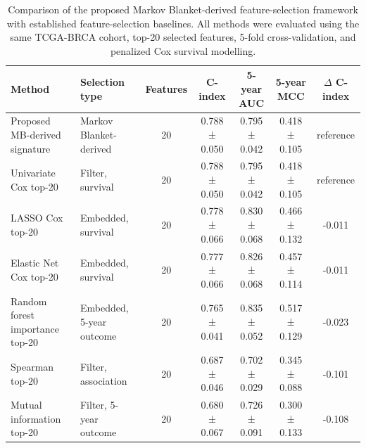 \begin{table}[htbp]
\centering
\small
\caption{Comparison of the proposed Markov Blanket-derived feature-selection framework with established feature-selection baselines. All methods were evaluated using the same TCGA-BRCA cohort, top-20 selected features, 5-fold cross-validation, and penalized Cox survival modelling.}
\label{tab:feature_selection_comparison}
\begin{tabular}{p{}p{}ccccc}
\hline
Method & Selection type & Features & C-index & 5-year AUC & 5-year MCC & $\Delta$ C-index \\
\hline
Proposed MB-derived signature & Markov Blanket-derived & 20 & 0.788 ± 0.050 & 0.795 ± 0.042 & 0.418 ± 0.105 & reference \\
Univariate Cox top-20 & Filter, survival & 20 & 0.788 ± 0.050 & 0.795 ± 0.042 & 0.418 ± 0.105 & reference \\
LASSO Cox top-20 & Embedded, survival & 20 & 0.778 ± 0.066 & 0.830 ± 0.068 & 0.466 ± 0.132 & -0.011 \\
Elastic Net Cox top-20 & Embedded, survival & 20 & 0.777 ± 0.066 & 0.826 ± 0.068 & 0.457 ± 0.114 & -0.011 \\
Random forest importance top-20 & Embedded, 5-year outcome & 20 & 0.765 ± 0.041 & 0.835 ± 0.052 & 0.517 ± 0.129 & -0.023 \\
Spearman top-20 & Filter, association & 20 & 0.687 ± 0.046 & 0.702 ± 0.029 & 0.345 ± 0.088 & -0.101 \\
Mutual information top-20 & Filter, 5-year outcome & 20 & 0.680 ± 0.067 & 0.726 ± 0.091 & 0.300 ± 0.133 & -0.108 \\
\hline
\end{tabular}
\end{table}